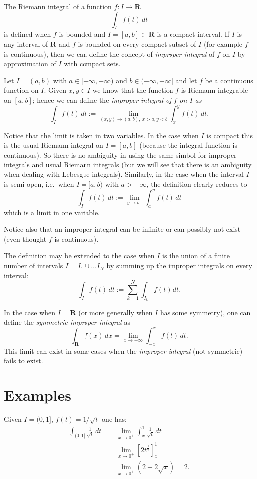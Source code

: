\documentclass[12pt]{article}
\newcommand{\R}{\mathbf R}
\begin{document}
The Riemann integral of a function $f\colon I\to \R$ 
\[
  \int_I f(t)\, dt
\]
is defined when $f$ is bounded and $I=[a,b]\subset \R$ is a compact interval.
If $I$ is any interval of $\R$ and $f$ is bounded on every compact subset of $I$ (for example $f$ is continuous), then we can define the concept of \emph{improper integral} of $f$ on $I$ by approximation of $I$ with compact sets.

Let $I=(a,b)$ with $a\in[-\infty,+\infty)$ and $b\in(-\infty,+\infty]$ and let $f$ be a continuous function on $I$. Given $x,y\in I$ we know that the function $f$ is Riemann integrable on $[a,b]$; hence we can define the \emph{improper integral of $f$ on $I$ as}
\[
  \int_I f(t)\, dt := \lim_{(x,y)\to(a,b),\ x>a, y<b} \int_x^y f(t)\, dt.
\]

Notice that the limit is taken in two variables. In the case when $I$ is compact 
this is the usual Riemann integral on $I=[a,b]$ (because the integral function is continuous). So there is no ambiguity in using the same simbol for improper integrals and usual Riemann integrals (but we will see that there is an ambiguity when dealing with Lebesgue integrals).
Similarly, in the case when the interval $I$ is semi-open, i.e.\ when $I=[a,b)$ with $a>-\infty$, the definition clearly reduces to
\[
  \int_I f(t)\, dt := \lim_{y\to b^-} \int_a^y f(t)\, dt
\]
which is a limit in one variable.

Notice also that an improper integral can be infinite or can possibly not exist (even thought $f$ is continuous).

The definition may be extended to the case when $I$ is the union of a finite number of intervals $I=I_1\cup\ldots I_N$ by summing up the improper integrals on every interval:
\[
  \int_I f(t)\, dt := \sum_{k=1}^N \int_{I_k} f(t)\, dt.
\]

In the case when $I=\R$ (or more generally when $I$ has some symmetry), one can define the \emph{symmetric improper integral} as 
\[
 \int_{\R} f(x)\, dx = \lim_{x\to+\infty} \int_{-x}^x f(t)\, dt.
\]
This limit can exist in some cases when the \emph{improper integral} (not symmetric) fails to exist.

\section{Examples}

Given $I=(0,1]$, $f(t)=1/\sqrt t$ one has:
\begin{align*}
  \int_{(0,1]} \frac 1 {\sqrt t}\, dt 
&= \lim_{x\to 0^+}\int_x^1 \frac 1 {\sqrt t}\, dt \\
&= \lim_{x\to 0^+} [2t^\frac 1 2]_x^1 \\
&= \lim_{x\to 0^+} (2-2\sqrt x) = 2. 
\end{align*}
\end{document}
